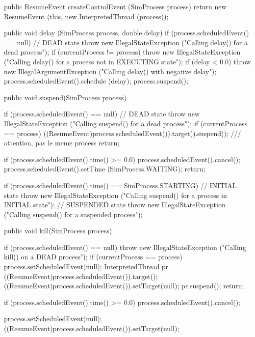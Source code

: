 \begin{code}\begin{hide}
   public ResumeEvent createControlEvent (SimProcess process) {
      return new ResumeEvent (this, new InterpretedThread (process));
   }

   public void delay (SimProcess process, double delay) {
      if (process.scheduledEvent() == null) // DEAD state
         throw new IllegalStateException
               ("Calling delay() for a dead process");
      if (currentProcess != process)
         throw new IllegalStateException
               ("Calling delay() for a process not in EXECUTING state");
      if (delay < 0.0)
         throw new IllegalArgumentException
               ("Calling delay() with negative delay");
      process.scheduledEvent().schedule (delay);
      process.suspend();
   }

   public void suspend(SimProcess process) {
      if (process.scheduledEvent() == null) // DEAD state
         throw new IllegalStateException
               ("Calling suspend() for a dead process");
      if (currentProcess == process) {
         ((ResumeEvent)process.scheduledEvent()).target().suspend();               /// attention, pas le meme process
         return;
      }

      if (process.scheduledEvent().time() >= 0.0) {
         process.scheduledEvent().cancel();
         process.scheduledEvent().setTime (SimProcess.WAITING);
         return;
      }

      if (process.scheduledEvent().time() == SimProcess.STARTING)
      // INITIAL state
         throw new IllegalStateException
               ("Calling suspend() for a process in INITIAL state");
      // SUSPENDED state
      throw new IllegalStateException
            ("Calling suspend() for a suspended process");
   }

   public void kill(SimProcess process) {
      if (process.scheduledEvent() == null)
         throw new IllegalStateException
            ("Calling kill() on a DEAD process");
      if (currentProcess == process) {
         process.setScheduledEvent(null);
         InterpretedThread pr = ((ResumeEvent)process.scheduledEvent()).target();
         ((ResumeEvent)process.scheduledEvent()).setTarget(null);
         pr.suspend();
         return;
      }

      if (process.scheduledEvent().time() >= 0.0)
         process.scheduledEvent().cancel();

      process.setScheduledEvent(null);
      ((ResumeEvent)process.scheduledEvent()).setTarget(null);
   }


\end{hide}
\end{code}

